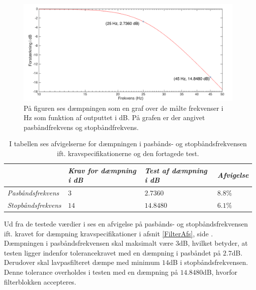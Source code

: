 \begin{figure}[H]
	\centering
	\includegraphics[scale=0.4]{figures/cProblemloesning/Lavpas_Matlab.PNG}
	\caption{På figuren ses dæmpningen som en graf over de målte frekvenser i Hz som funktion af outputtet i dB. På grafen er der angivet pasbåndfrekvens og stopbåndfrekvens.}
	\label{fig:Lavpas_Matlab}
\end{figure}

\begin{table}[H]
	\centering
	\begin{tabular}{|l|l|l|l|}
		\cline{2-4} \multicolumn{1}{l|}{}
		& \textit{Krav for dæmpning i dB} 	& \textit{Test af dæmpning i dB}  &\textit{Afvigelse} \\ \hline
		\textit{Pasbåndsfrekvens} & $3$	& $2.7360$	    & $8.8\%$ \\ \hline
		\textit{Stopbåndsfrekvens} & $14$    & $14.8480$    & $6.1\%$  \\ \hline
	\end{tabular}
	\caption{I tabellen ses afvigelserne for dæmpningen i pasbånds- og stopbåndsfrekvensen ift. kravspecifikationerne og den fortagede test.}
	\label{Tab:Tolerance}
\end{table}
\noindent Ud fra de testede værdier i  ses en afvigelse på pasbånds- og stopbåndsfrekvensen ift. kravet for dæmpning kravspecifikationer i afsnit \ref{FilterAfs}, side \pageref{FilterAfs}. Dæmpningen i pasbåndsfrekvensen skal maksimalt være $3$dB, hvilket betyder, at testen ligger indenfor tolerancekravet med en dæmpning i pasbåndet på $2.7$dB. Derudover skal lavpasfilteret dæmpe med minimum $14$dB i stopbåndsfrekvensen. Denne tolerance overholdes i testen med en dæmpning på $14.8480$dB, hvorfor filterblokken accepteres.\\

